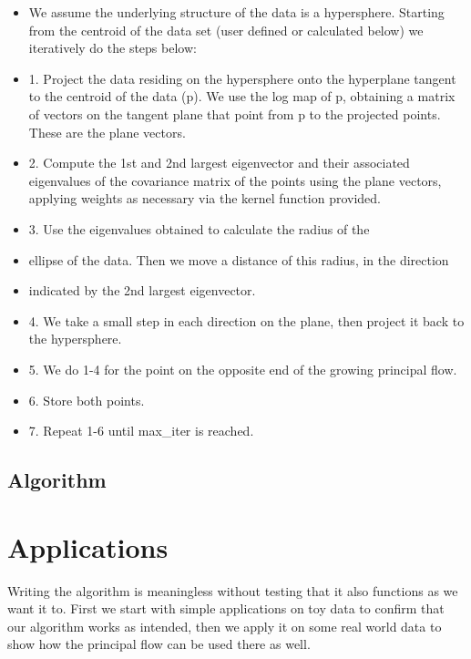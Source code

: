 \documentclass[12pt]{report}
\begin{document}
\begin{itemize}
    \item We assume the underlying structure of the data is a hypersphere.
    Starting from the centroid of the data set (user defined or calculated below) we
    iteratively do the steps below:

    \item 1. Project the data residing on the hypersphere onto the hyperplane
    tangent to the centroid of the data (p). We use the log map of p, 
    obtaining a matrix of vectors on the tangent plane that point from p
    to the projected points. These are the plane vectors.

    \item 2. Compute the 1st and 2nd largest eigenvector and their associated
    eigenvalues of the covariance matrix of the points using the plane vectors, 
    applying weights as necessary via the kernel function provided.

    \item 3. Use the eigenvalues obtained to calculate the radius of the
    \item ellipse of the data. Then we move a distance of this radius, in the direction
    \item indicated by the 2nd largest eigenvector.

    \item 4. We take a small step in each direction on the plane,
    then project it back to the hypersphere.

    \item 5. We do 1-4 for the point on the opposite end of the growing principal flow.

    \item 6. Store both points. 
    
    \item 7. Repeat 1-6 until max\_iter is reached.
\end{itemize}

\section{Algorithm}

\chapter{Applications}
Writing the algorithm is meaningless without testing that it also functions 
as we want it to. First we start with simple applications on toy data to confirm that 
our algorithm works as intended, then we apply it on some real world data to show
how the principal flow can be used there as well.
\end{document}
